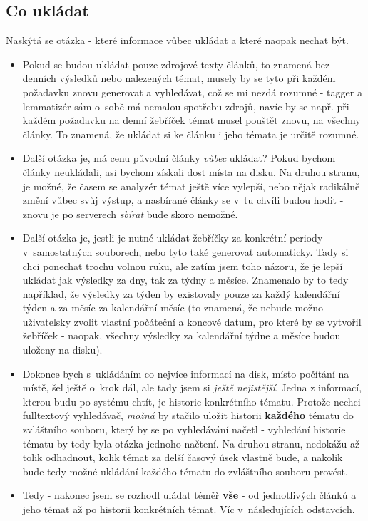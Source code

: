 \documentclass[12pt]{amsart}
\begin{document}
\subsection{Co ukládat}
Naskýtá se otázka - které informace vůbec ukládat a které naopak nechat být.
\begin{itemize}
    \item Pokud se budou ukládat pouze zdrojové texty článků, to znamená bez denních výsledků nebo nalezených témat, musely by se tyto při každém požadavku znovu generovat a vyhledávat, což se mi nezdá rozumné - tagger a lemmatizér sám o~sobě má nemalou spotřebu zdrojů, navíc by se např. při každém požadavku na denní žebříček témat musel pouštět znovu, na všechny články. To znamená, že ukládat si ke článku i jeho témata je určitě rozumné.
    \item Další otázka je, má cenu původní články \emph{vůbec} ukládat? Pokud bychom články neukládali, asi bychom získali dost místa na disku. Na druhou stranu, je možné, že časem se analyzér témat ještě více vylepší, nebo nějak radikálně změní vůbec svůj výstup, a nasbírané články se v~tu chvíli budou hodit - znovu je po serverech \emph{sbírat} bude skoro nemožné.
    \item Další otázka je, jestli je nutné ukládat žebříčky za konkrétní periody v~samostatných souborech, nebo tyto také generovat automaticky. Tady si chci ponechat trochu volnou ruku, ale zatím jsem toho názoru, že je lepší ukládat  jak výsledky za dny, tak za týdny a měsíce. Znamenalo by to tedy například, že výsledky za týden by existovaly pouze za každý kalendářní týden a za měsíc za kalendářní měsíc (to znamená, že nebude možno uživatelsky zvolit vlastní počáteční a koncové datum, pro které by se vytvořil žebříček - naopak, všechny výsledky za kalendářní týdne a měsíce budou uloženy na disku).
    \item Dokonce bych s~ukládáním co nejvíce informací na disk, místo počítání na místě, šel ještě o~krok dál, ale tady jsem si \emph{ještě nejistější}. Jedna z in\-for\-mací, kterou budu po systému chtít, je historie konkrétního tématu. Protože nechci fulltextový vyhledávač, \emph{možná} by stačilo uložit historii \textbf{každého} tématu do zvláštního souboru, který by se po vyhledávání načetl - vyhledání historie tématu by tedy byla otázka jednoho načtení. Na druhou stranu, nedokážu až tolik odhadnout, kolik témat za delší časový úsek vlastně bude, a nakolik bude tedy možné ukládání každého tématu do zvláštního souboru provést.
    \item Tedy - nakonec jsem se rozhodl uládat téměř \textbf{vše} - od jednotlivých článků a jeho témat až po historii konkrétních témat. Víc v~následujících odstavcích.
\end{itemize}
\end{document}
